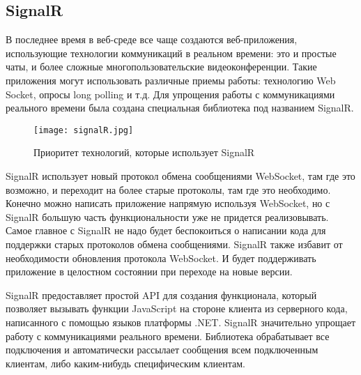 \subsection{SignalR}

В последнее время в веб-среде все чаще создаются веб-приложения, использующие технологии коммуникаций в реальном времени: это и простые чаты, и более сложные многопользовательские видеоконференции. Такие приложения могут использовать различные приемы работы: технологию Web Socket, опросы long polling и т.д. Для упрощения работы с коммуникациями реального времени была создана специальная библиотека под названием SignalR.

\begin{figure}[h!]
	\centering
	\texttt{[image: signalR.jpg]}
	\caption{Приоритет технологий, которые использует SignalR}
\end{figure}

SignalR использует новый протокол обмена сообщениями WebSocket, там где это возможно, и переходит на более старые протоколы, там где это необходимо. Конечно можно написать приложение напрямую используя WebSocket, но с SignalR большую часть функциональности уже не придется реализовывать. Самое главное с SignalR не надо будет беспокоиться о написании кода для поддержки старых протоколов обмена сообщениями. SignalR также избавит от необходимости обновления протокола WebSocket. И будет поддерживать приложение в целостном состоянии при переходе на новые версии.

SignalR предоставляет простой API для создания функционала, который позволяет вызывать функции JavaScript на стороне клиента из серверного кода, написанного с помощью языков платформы .NET. SignalR значительно упрощает работу с коммуникациями реального времени. Библиотека обрабатывает все подключения и автоматически рассылает сообщения всем подключенным клиентам, либо каким-нибудь специфическим клиентам.